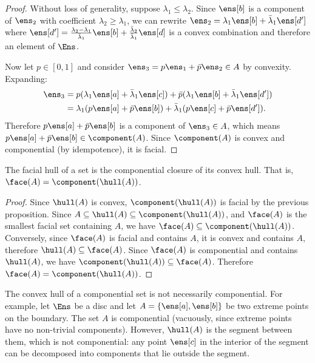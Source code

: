 \begin{mathSection}
\begin{proof}
		Without loss of generality, suppose $\lambda_1 \leq \lambda_2$. Since $\ens[b]$ is a component of $\ens_2$ with coefficient $\lambda_2 \geq \lambda_1$, we can rewrite $\ens_2 = \lambda_1 \ens[b] + \bar{\lambda}_1 \ens[d']$ where $\ens[d'] = \frac{\lambda_2 - \lambda_1}{\bar{\lambda}_1} \ens[b] + \frac{\bar{\lambda}_2}{\bar{\lambda}_1} \ens[d]$ is a convex combination and therefore an element of $\Ens$.
		
		Now let $p \in [0,1]$ and consider $\ens_3 = p \ens_1 + \bar{p} \ens_2 \in A$ by convexity. Expanding:
		\begin{equation}
			\begin{aligned}
				\ens_3 &= p(\lambda_1 \ens[a] + \bar{\lambda}_1 \ens[c]) + \bar{p}(\lambda_1 \ens[b] + \bar{\lambda}_1 \ens[d']) \\
				&= \lambda_1(p \ens[a] + \bar{p} \ens[b]) + \bar{\lambda}_1(p \ens[c] + \bar{p} \ens[d']).
			\end{aligned}
		\end{equation}
		Therefore $p\ens[a] + \bar{p}\ens[b]$ is a component of $\ens_3 \in A$, which means $p\ens[a] + \bar{p}\ens[b] \in \component(A)$. Since $\component(A)$ is convex and componential (by idempotence), it is facial.
	\end{proof}
	
	\begin{coro}
		The facial hull of a set is the componential closure of its convex hull. That is, $\face(A) = \component(\hull(A))$.
	\end{coro}
	
	\begin{proof}
		Since $\hull(A)$ is convex, $\component(\hull(A))$ is facial by the previous proposition. Since $A \subseteq \hull(A) \subseteq \component(\hull(A))$, and $\face(A)$ is the smallest facial set containing $A$, we have $\face(A) \subseteq \component(\hull(A))$. Conversely, since $\face(A)$ is facial and contains $A$, it is convex and contains $A$, therefore $\hull(A) \subseteq \face(A)$. Since $\face(A)$ is componential and contains $\hull(A)$, we have $\component(\hull(A)) \subseteq \face(A)$. Therefore $\face(A) = \component(\hull(A))$.
	\end{proof}
	
	\begin{remark}
		The convex hull of a componential set is not necessarily componential. For example, let $\Ens$ be a disc and let $A = \{\ens[a], \ens[b]\}$ be two extreme points on the boundary. The set $A$ is componential (vacuously, since extreme points have no non-trivial components). However, $\hull(A)$ is the segment between them, which is not componential: any point $\ens[c]$ in the interior of the segment can be decomposed into components that lie outside the segment.
		

\end{remark}
\end{mathSection}
